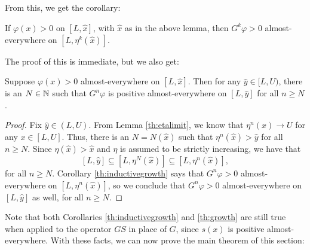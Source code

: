 From this, we get the corollary:

\begin{corollary} \label{th:inductivegrowth}
	If $\varphi(x) > 0$ on $[L, \hat x]$, with $\hat x$ as in the above lemma, then $G^k \varphi > 0$ almost-everywhere on $[L, \eta^k(\hat x)]$.
\end{corollary}
The proof of this is immediate, but we also get:
\begin{corollary} \label{th:growth}
	Suppose $\varphi(x) > 0$ almost-everywhere on $[L, \hat x]$. Then for any $\hat y \in [L, U)$, there is an $N \in \mathbb{N}$ such that $G^n \varphi$ is positive almost-everywhere on $[L, \hat y]$ for all $n \geq N$.
\end{corollary}

\begin{proof}
	Fix $\hat y \in (L, U)$. From Lemma \ref{th:etalimit}, we know that $\eta^n(x) \to U$ for any $x \in [L, U]$. Thus, there is an $N = N(\hat x)$ such that $\eta^n(\hat x) > \hat y$ for all $n \geq N$. Since $\eta(\hat x) > \hat x$ and $\eta$ is assumed to be strictly increasing, we have that 
	\[[L, \hat y] \subseteq [L, \eta^N(\hat x)] \subseteq [L, \eta^n(\hat x)],\]
	for all $n \geq N$. Corollary \ref{th:inductivegrowth} says that $G^n \varphi > 0$ almost-everywhere on $[L, \eta^n(\hat x)]$, so we conclude that $G^n \varphi > 0$ almost-everywhere on $[L, \hat y]$ as well, for all $n \geq N$. 
\end{proof}

Note that both Corollaries \ref{th:inductivegrowth} and \ref{th:growth} are still true when applied to the operator $GS$ in place of $G$, since $s(x)$ is positive almost-everywhere. With these facts, we can now prove the main theorem of this section:

